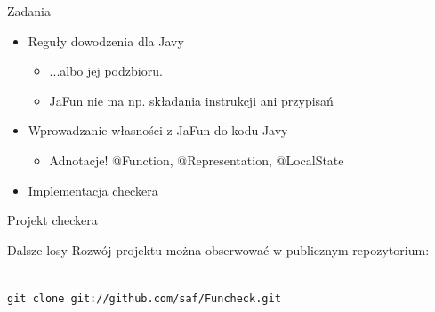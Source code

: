 \documentclass{beamer}
\begin{document}
\begin{frame}{Zadania}
  \begin{itemize}
  \item<1-> Reguły dowodzenia dla Javy
    \pause
    \begin{itemize}
      \item ...albo jej podzbioru.
      \item JaFun nie ma np. składania instrukcji ani przypisań
    \end{itemize}
  \item<2-> Wprowadzanie własności z JaFun do kodu Javy
    \begin{itemize}
    \item Adnotacje! {\color{annot} @Function}, 
      {\color{annot} @Representation}, {\color{annot} @LocalState}
    \end{itemize}
  \item<3-> Implementacja checkera
  \end{itemize}
\end{frame}

\begin{frame}{Projekt checkera}
  \begin{center}
  \end{center}
\end{frame}

\begin{frame}{Dalsze losy}
Rozwój projektu można obserwować w publicznym repozytorium:
\begin{center}
\vspace{3mm}
\\
\vspace{3mm}
\texttt{git clone git://github.com/saf/Funcheck.git}
\end{center}
\end{frame}
\end{document}
